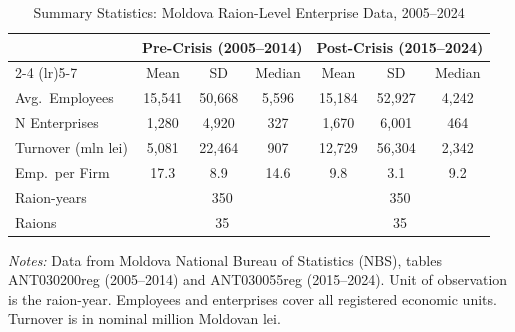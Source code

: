 \begin{table}[htbp]
\centering
\begin{threeparttable}
\caption{Summary Statistics: Moldova Raion-Level Enterprise Data, 2005--2024}
\label{tab:summary}
\begin{tabular}{lcccccc}
\hline\hline
 & \multicolumn{3}{c}{Pre-Crisis (2005--2014)} & \multicolumn{3}{c}{Post-Crisis (2015--2024)} \\
\cmidrule(lr){2-4} \cmidrule(lr){5-7}
 & Mean & SD & Median & Mean & SD & Median \\
\hline
Avg.\ Employees & 15,541 & 50,668 & 5,596 & 15,184 & 52,927 & 4,242 \\
N Enterprises & 1,280 & 4,920 & 327 & 1,670 & 6,001 & 464 \\
Turnover (mln lei) & 5,081 & 22,464 & 907 & 12,729 & 56,304 & 2,342 \\
Emp.\ per Firm & 17.3 & 8.9 & 14.6 & 9.8 & 3.1 & 9.2 \\
\hline
Raion-years & \multicolumn{3}{c}{350} & \multicolumn{3}{c}{350} \\
Raions & \multicolumn{3}{c}{35} & \multicolumn{3}{c}{35} \\
\hline\hline
\end{tabular}
\begin{tablenotes}[flushleft]\small
\item \textit{Notes:} Data from Moldova National Bureau of Statistics (NBS), tables ANT030200reg (2005--2014) and ANT030055reg (2015--2024). Unit of observation is the raion-year. Employees and enterprises cover all registered economic units. Turnover is in nominal million Moldovan lei.
\end{tablenotes}
\end{threeparttable}
\end{table}
